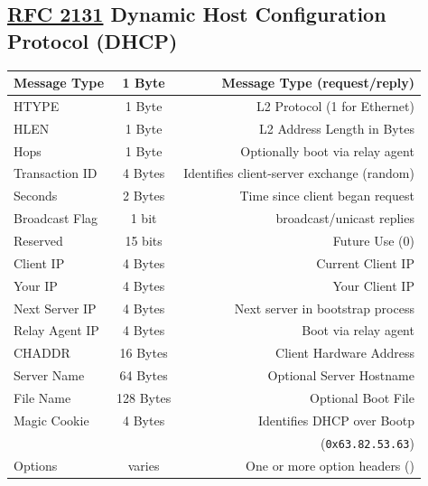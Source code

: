 \documentclass[12pt]{article}
\newcommand{\RFC}[1]{\href{https://datatracker.ietf.org/doc/html/rfc#1}{RFC #1}}
\begin{document}
	\subsection[RFC 2131 DHCP]{\RFC{2131} Dynamic Host Configuration Protocol (DHCP) \label{subsec:DHCP}}
	\begin{table}[H]
	\centering
	\begin{tabular}{| l | c | r |}
	\hline
	Message Type		& 1 Byte	& Message Type (request/reply)\\\hline
	HTYPE			& 1 Byte	& L2 Protocol (1 for Ethernet)\\\hline
	HLEN				& 1 Byte	& L2 Address Length in Bytes\\\hline
	Hops				& 1 Byte	& Optionally boot via relay agent\\\hline
	Transaction ID		& 4 Bytes	& Identifies client-server exchange (random)\\\hline
	Seconds			& 2 Bytes	& Time since client began request\\\hline
	Broadcast Flag		& 1 bit 	& broadcast/unicast replies\\\hline
	Reserved			& 15 bits	& Future Use (0)\\\hline
	Client IP			& 4 Bytes	& Current Client IP\\\hline
	Your IP			& 4 Bytes	& Your Client IP\\\hline
	Next Server IP		& 4 Bytes	& Next server in bootstrap process\\\hline
	Relay Agent IP		& 4 Bytes	& Boot via relay agent\\\hline
	CHADDR			& 16 Bytes	& Client Hardware Address\\\hline
	Server Name		& 64 Bytes	& Optional Server Hostname\\\hline
	File Name			& 128 Bytes	& Optional Boot File\\\hline
	Magic Cookie		& 4 Bytes	& Identifies DHCP over Bootp\\
					&		& (\texttt{0x63.82.53.63})\\\hline
	Options			& varies	& One or more option headers (\Cref{tab:DHCP OPTIONS})\\\hline
	\end{tabular}\end{table}
\end{document}
